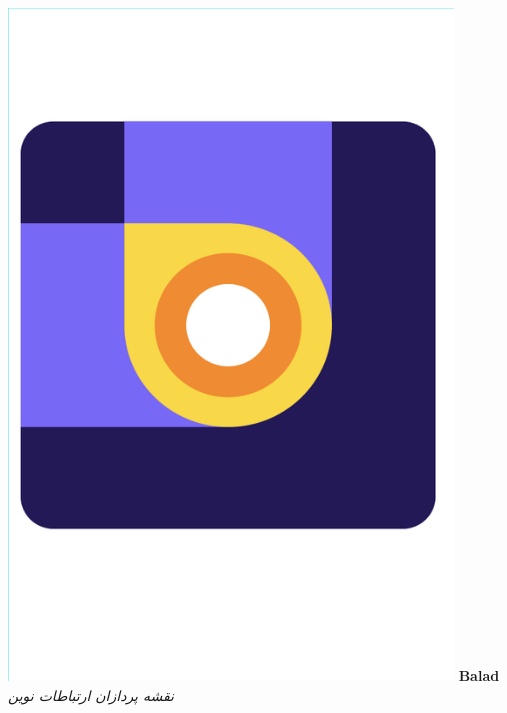 \documentclass{beamer}
\begin{document}
\begin{frame}
\begin{columns}
    \includegraphics[height=0.5\textheight]{./img/balad.png}
    \textbf{Balad}\\
    \textit{نقشه پردازان ارتباطات نوین}

\end{columns}
\end{frame}
\end{document}
